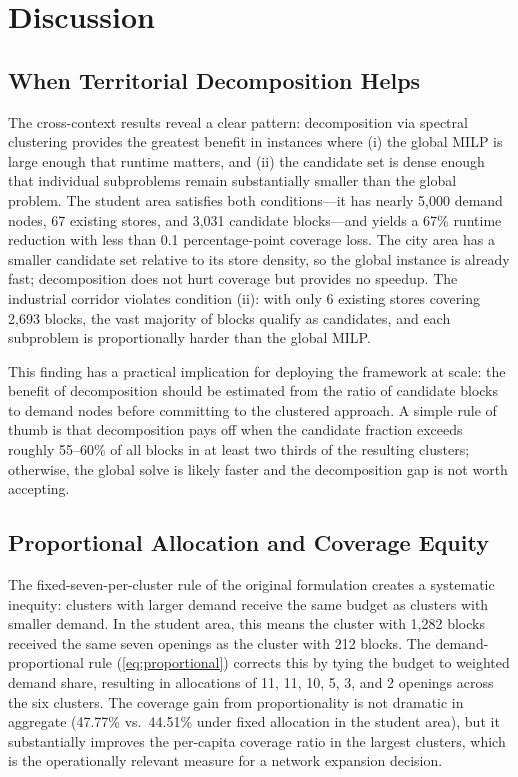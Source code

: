 \section{Discussion}
\label{sec:discussion}

\subsection{When Territorial Decomposition Helps}

The cross-context results reveal a clear pattern: decomposition via
spectral clustering provides the greatest benefit in instances where
(i) the global MILP is large enough that runtime matters, and
(ii) the candidate set is dense enough that individual subproblems
remain substantially smaller than the global problem.
The student area satisfies both conditions---it has nearly 5,000 demand
nodes, 67 existing stores, and 3,031 candidate blocks---and yields
a 67\% runtime reduction with less than 0.1 percentage-point coverage loss.
The city area has a smaller candidate set relative to its store density,
so the global instance is already fast; decomposition does not hurt
coverage but provides no speedup.
The industrial corridor violates condition (ii): with only 6 existing
stores covering 2,693 blocks, the vast majority of blocks qualify as
candidates, and each subproblem is proportionally harder than the global MILP.

This finding has a practical implication for deploying the framework
at scale: the benefit of decomposition should be estimated from the
ratio of candidate blocks to demand nodes before committing to the
clustered approach.
A simple rule of thumb is that decomposition pays off when the candidate
fraction exceeds roughly 55--60\% of all blocks in at least two thirds
of the resulting clusters; otherwise, the global solve is likely
faster and the decomposition gap is not worth accepting.

\subsection{Proportional Allocation and Coverage Equity}

The fixed-seven-per-cluster rule of the original formulation creates
a systematic inequity: clusters with larger demand receive the same
budget as clusters with smaller demand.
In the student area, this means the cluster with 1,282 blocks received
the same seven openings as the cluster with 212 blocks.
The demand-proportional rule (\cref{eq:proportional}) corrects this by
tying the budget to weighted demand share, resulting in allocations of
11, 11, 10, 5, 3, and 2 openings across the six clusters.
The coverage gain from proportionality is not dramatic in aggregate
(47.77\% vs.\ 44.51\% under fixed allocation in the student area),
but it substantially improves the per-capita coverage ratio in
the largest clusters, which is the operationally relevant measure
for a network expansion decision.

